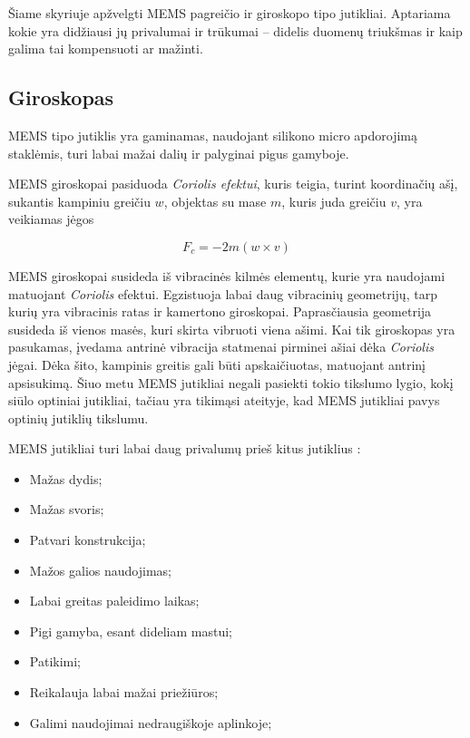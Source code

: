 Šiame skyriuje apžvelgti MEMS pagreičio ir giroskopo tipo jutikliai. Aptariama kokie yra didžiausi jų privalumai ir trūkumai -- didelis duomenų triukšmas ir kaip galima tai kompensuoti ar mažinti.

\subsection{Giroskopas}

MEMS tipo jutiklis \cite{perlmutter2012high} yra gaminamas, naudojant silikono micro apdorojimą staklėmis, turi labai mažai dalių ir palyginai pigus gamyboje.

MEMS giroskopai pasiduoda \textit{Coriolis efektui}, kuris teigia, turint koordinačių ašį, sukantis kampiniu greičiu $w$, objektas su mase $m$, kuris juda greičiu $v$, yra veikiamas jėgos

\begin{equation}
    F_c = -2m(w \times v)
\end{equation}

MEMS giroskopai susideda iš vibracinės kilmės elementų, kurie yra naudojami matuojant \textit{Coriolis} efektui. Egzistuoja labai daug vibracinių geometrijų, tarp kurių yra vibracinis ratas ir kamertono giroskopai. Paprasčiausia geometrija susideda iš vienos masės, kuri skirta vibruoti viena ašimi. Kai tik giroskopas yra pasukamas, įvedama antrinė vibracija statmenai pirminei ašiai dėka \textit{Coriolis} jėgai. Dėka šito, kampinis greitis gali būti apskaičiuotas, matuojant antrinį apsisukimą. Šiuo metu MEMS jutikliai negali pasiekti tokio tikslumo lygio, kokį siūlo optiniai jutikliai, tačiau yra tikimąsi ateityje, kad MEMS jutikliai pavys optinių jutiklių tikslumu.

MEMS jutikliai turi labai daug privalumų prieš kitus jutiklius \cite{titterton2004strapdown}:

\begin{itemize}
    \item Mažas dydis;
    \item Mažas svoris;
    \item Patvari konstrukcija;
    \item Mažos galios naudojimas;
    \item Labai greitas paleidimo laikas;
    \item Pigi gamyba, esant dideliam mastui;
    \item Patikimi;
    \item Reikalauja labai mažai priežiūros;
    \item Galimi naudojimai nedraugiškoje aplinkoje;
\end{itemize}

